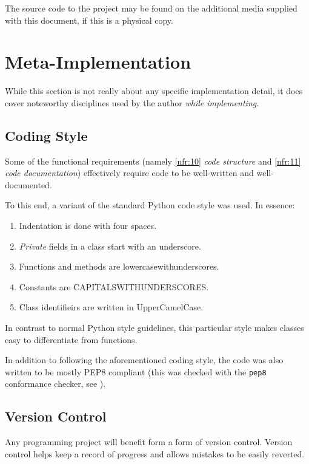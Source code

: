 \documentclass[10pt,a4paper,notitlepage]{report}
\begin{document}
The source code to the project may be found on the additional media supplied with this document, if this is a physical copy.

\section{Meta-Implementation}
While this section is not really about any specific implementation detail, it does cover noteworthy disciplines used by the author \emph{while implementing}.

\subsection{Coding Style}
Some of the functional requirements (namely \ref{nfr:10} \emph{code structure} and \ref{nfr:11} \emph{code documentation}) effectively require code to be well-written and well-documented.

To this end, a variant of the standard Python code style was used. In essence:
\begin{enumerate}[label=\roman*)]
\item Indentation is done with four spaces.\\
\item \emph{Private} fields in a class start with an underscore.\\
\item Functions and methods are lower\textunderscore{}case\textunderscore{}with\textunderscore{}underscores.\\
\item Constants are CAPITALS\textunderscore{}WITH\textunderscore{}UNDERSCORES.\\
\item Class identifieirs are written in UpperCamelCase.
\end{enumerate}

In contrast to normal Python style guidelines, this particular style makes classes easy to differentiate from functions.

In addition to following the aforementioned coding style, the code was also written to be mostly PEP8\cite{pep8} compliant (this was checked with the \texttt{pep8} conformance checker, see \cite{pep8chk}).

\subsection{Version Control}
Any programming project will benefit form a form of version control. Version control helps keep a record of progress and allows mistakes to be easily reverted.
\end{document}
